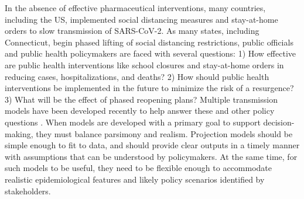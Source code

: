 \documentclass[11pt]{article}
\begin{document}
In the absence of effective pharmaceutical interventions, many countries, including the US, implemented social distancing measures and stay-at-home orders to slow transmission of SARS-CoV-2. 
As many states, including Connecticut, begin phased lifting of social distancing restrictions, public officials and public health policymakers are faced with several questions: 1) How effective are public health interventions like school closures and stay-at-home orders in reducing cases, hospitalizations, and deaths? 2)  How should public health interventions be implemented in the future to minimize the risk of a resurgence? 3) What will be the effect of phased reopening plans?  
Multiple transmission models have been developed recently to help answer these and other policy questions \citep{cdc2020covid19forecasts, kissler2020projecting, ferguson2020impact, unwin2020state, brett2020covid, miller2020mobility, aleta2020modeling, childs2020impact, yamana2020projection, zou2020epidemic, tian2020evaluate, perez2020importance, salje2020estimating, didomenico2020expected, dehning2020inferring, ferretti2020quantifying, prem2020effect, chinazzi2020effect, kucharski2020early, leung2020first, britton2020disease, gomes2020individual}. 
When models are developed with a primary goal to support decision-making, they must balance parsimony and realism. Projection models should be simple enough to fit to data, and should provide clear outputs in a timely manner with assumptions that can be understood by policymakers. At the same time, for such models to be useful, they need to be flexible enough to accommodate realistic epidemiological features and likely policy scenarios identified by stakeholders.  
\end{document}
